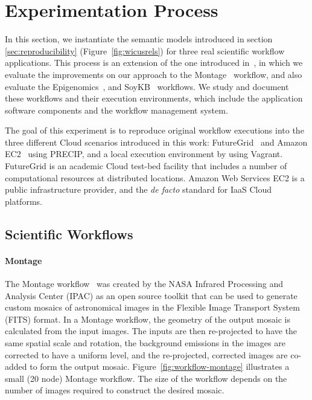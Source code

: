 \section{Experimentation Process}
\label{sec:experiment}


In this section, we instantiate the semantic models introduced in section \ref{sec:reproducibility}
(Figure~\ref{fig:wicusrels}) for three real scientific workflow applications. 
This process is an extension of the one introduced
 in~\cite{SantanaPerez-REPPAR-2014}, in which we evaluate the improvements on our
 approach to the Montage~\cite{Montage} workflow, and also evaluate the
 Epigenomics~\cite{genome}, and SoyKB~\cite{soybean, Joshi01012014} workflows.
We study and document these workflows and their execution environments, which include the application software components 
and the workflow management system.

The goal of this experiment is to reproduce original workflow executions into the three different 
Cloud scenarios introduced in this work: FutureGrid~\cite{futuregrid} and Amazon EC2~\cite{aws} 
using PRECIP, and a local execution environment by using Vagrant. 
FutureGrid is an academic Cloud test-bed facility that includes a number of computational 
resources at distributed locations. Amazon Web Services EC2 is a public infrastructure 
provider, and the \emph{de facto} standard for IaaS Cloud platforms. 


\subsection{Scientific Workflows}

\paragraph{\textbf{Montage}}
The Montage workflow~\cite{Montage} was created by the NASA Infrared Processing 
and Analysis Center (IPAC) as an open source toolkit that can be used to generate 
custom mosaics of astronomical images in the Flexible Image Transport System (FITS) 
format. In a Montage workflow, the geometry of the output mosaic is calculated from the 
input images. The inputs are then re-projected to have the same spatial scale and rotation, 
the background emissions in the images are corrected to have a uniform level, and the 
re-projected, corrected images are co-added to form the output mosaic. 
Figure~\ref{fig:workflow-montage} illustrates a small (20 node) Montage workflow. The 
size of the workflow depends on the number of images required to construct the desired 
mosaic.

